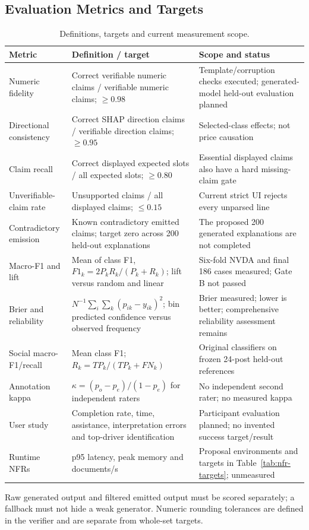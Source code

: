 \subsection{Evaluation Metrics and Targets}
\begingroup\small
\begin{longtable}{p{}p{}p{}}
\caption{Definitions, targets and current measurement scope.}\label{tab:metrics-matrix}\\\toprule Metric & Definition / target & Scope and status\\\midrule
Numeric fidelity & Correct verifiable numeric claims / verifiable numeric claims; $\geq0.98$ & Template/corruption checks executed; generated-model held-out evaluation planned\\
Directional consistency & Correct SHAP direction claims / verifiable direction claims; $\geq0.95$ & Selected-class effects; not price causation\\
Claim recall & Correct displayed expected slots / all expected slots; $\geq0.80$ & Essential displayed claims also have a hard missing-claim gate\\
Unverifiable-claim rate & Unsupported claims / all displayed claims; $\leq0.15$ & Current strict UI rejects every unparsed line\\
Contradictory emission & Known contradictory emitted claims; target zero across 200 held-out explanations & The proposed 200 generated explanations are not completed\\
Macro-F1 and lift & Mean of class F1, $F1_k=2P_kR_k/(P_k+R_k)$; lift versus random and linear & Six-fold NVDA and final 186 cases measured; Gate B not passed\\
Brier and reliability & $N^{-1}\sum_i\sum_k(p_{ik}-y_{ik})^2$; bin predicted confidence versus observed frequency & Brier measured; lower is better; comprehensive reliability assessment remains\\
Social macro-F1/recall & Mean class F1; $R_k=TP_k/(TP_k+FN_k)$ & Original classifiers on frozen 24-post held-out references\\
Annotation kappa & $\kappa=(p_o-p_e)/(1-p_e)$ for independent raters & No independent second rater; no measured kappa\\
User study & Completion rate, time, assistance, interpretation errors and top-driver identification & Participant evaluation planned; no invented success target/result\\
Runtime NFRs & p95 latency, peak memory and documents/s & Proposal environments and targets in Table~\ref{tab:nfr-targets}; unmeasured\\
\bottomrule\end{longtable}\endgroup
Raw generated output and filtered emitted output must be scored separately; a fallback must not hide a weak generator. Numeric rounding tolerances are defined in the verifier and are separate from whole-set targets.
